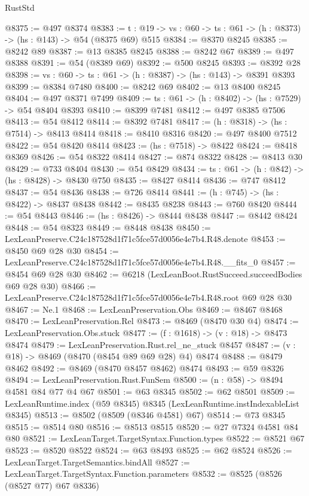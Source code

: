 \begin{lexlean}{RustStd}
\begin{coremodule}
@8375 := @497 @8374
@8383 := {t : @19} -> {vs : @60} -> {ts : @61} -> (h : @8373) -> (hs : @143) -> @54 (@8375 @69) @515
@8384 := @8370 @8245
@8385 := @8242 @89
@8387 := @13 @8385 @8245
@8388 := @8242 @67
@8389 := @497 @8388
@8391 := @54 (@8389 @69)
@8392 := @500 @8245
@8393 := @8392 @28
@8398 := {vs : @60} -> {ts : @61} -> (h : @8387) -> (hs : @143) -> @8391 @8393
@8399 := @8384 @7480
@8400 := @8242 @69
@8402 := @13 @8400 @8245
@8404 := @497 @8371 @7499
@8409 := {ts : @61} -> (h : @8402) -> (hs : @7529) -> @54 @8404 @8393
@8410 := @8399 @7481
@8412 := @497 @8385 @7506
@8413 := @54 @8412
@8414 := @8392 @7481
@8417 := (h : @8318) -> (hs : @7514) -> @8413 @8414
@8418 := @8410 @8316
@8420 := @497 @8400 @7512
@8422 := @54 @8420 @8414
@8423 := (hs : @7518) -> @8422
@8424 := @8418 @8369
@8426 := @54 @8322 @8414
@8427 := @874 @8322
@8428 := @8413 @30
@8429 := @733 @8404
@8430 := @54 @8429
@8434 := {ts : @61} -> (h : @842) -> (hs : @8428) -> @8430 @750
@8435 := @8427 @8414
@8436 := @747 @8412
@8437 := @54 @8436
@8438 := @726 @8414
@8441 := (h : @745) -> (hs : @8422) -> @8437 @8438
@8442 := @8435 @8238
@8443 := @760 @8420
@8444 := @54 @8443
@8446 := (hs : @8426) -> @8444 @8438
@8447 := @8442 @8424
@8448 := @54 @8323
@8449 := @8448 @8438
@8450 := LexLeanPreserve.C24c187528d1f71c5fce57d0056e4e7b4.R48.denote
@8453 := @8450 @69 @28 @30
@8454 := LexLeanPreserve.C24c187528d1f71c5fce57d0056e4e7b4.R48.__fits_0
@8457 := @8454 @69 @28 @30
@8462 := @6218 (LexLeanBoot.RustSucceed.succeedBodies @69 @28 @30)
@8466 := LexLeanPreserve.C24c187528d1f71c5fce57d0056e4e7b4.R48.root @69 @28 @30
@8467 := Ne.{1}
@8468 := LexLeanPreservation.Obs
@8469 := @8467 @8468
@8470 := LexLeanPreservation.Rel
@8473 := @8469 (@8470 @30 @4)
@8474 := LexLeanPreservation.Obs.stuck
@8477 := (f : @1618) -> (v : @18) -> @8473 @8474
@8479 := LexLeanPreservation.Rust.rel_ne_stuck @8457
@8487 := (v : @18) -> @8469 (@8470 (@8454 @89 @69 @28) @4) @8474
@8488 := @8479 @8462
@8492 := @8469 (@8470 @8457 @8462) @8474
@8493 := @59 @8326
@8494 := LexLeanPreservation.Rust.FunSem
@8500 := (n : @58) -> @8494 @4581 @84 @77 @4 @67
@8501 := @63 @8345
@8502 := @62 @8501
@8509 := LexLeanRuntime.index (@59 @8345) @8345 (LexLeanRuntime.instIndexableList @8345)
@8513 := @8502 (@8509 (@8346 @4581) @67)
@8514 := @73 @8345
@8515 := @8514 @80
@8516 := @8513 @8515
@8520 := @27 @7324 @4581 @84 @80
@8521 := LexLeanTarget.TargetSyntax.Function.types
@8522 := @8521 @67
@8523 := @8520 @8522
@8524 := @63 @8493
@8525 := @62 @8524
@8526 := LexLeanTarget.TargetSemantics.bindAll
@8527 := LexLeanTarget.TargetSyntax.Function.parameters
@8532 := @8525 (@8526 (@8527 @77) @67 @8336)

\end{coremodule}
\end{lexlean}

